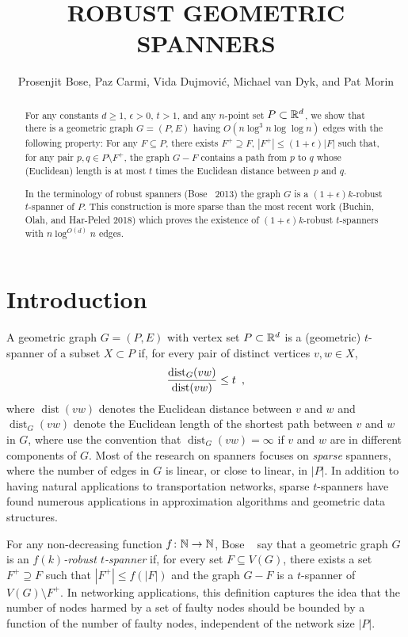 \documentclass{patmorin}
\title{\MakeUppercase{Robust Geometric Spanners}}
\author{Prosenjit Bose, Paz Carmi, Vida Dujmovi\'c, 
        Michael van Dyk, and Pat Morin}
\DeclareMathOperator{\dist}{dist}
\begin{document}
\maketitle


\begin{abstract}
  For any constants $d\ge 1$, $\epsilon >0$, $t>1$, and any $n$-point
  set $P\subset\mathbb{R}^d$, we show that there is a geometric graph $G=(P,E)$
  having $O(n\log^3 n\log\log n)$ edges with the following property:
  For any $F\subseteq P$, there exists $F^+\supseteq F$, $|F^+| \le
  (1+\epsilon)|F|$ such that, for any pair $p,q\in P\setminus F^+$,
  the graph $G-F$ contains a path from $p$ to $q$ whose (Euclidean)
  length is at most $t$ times the Euclidean distance between $p$ and $q$.
  
  In the terminology of robust spanners (Bose \etal\ 2013) the graph $G$
  is a $(1+\epsilon)k$-robust $t$-spanner of $P$. This construction is
  more sparse than the most recent work (Buchin, Olah, and Har-Peled 2018)
  which proves the existence of $(1+\epsilon)k$-robust $t$-spanners with
  $n\log^{O(d)} n$ edges.
\end{abstract}

\section{Introduction}

A geometric graph $G=(P,E)$ with vertex set $P\subset\mathbb{R}^d$ is a (geometric)
$t$-spanner of a subset $X\subset P$ if, for every pair of distinct vertices
$v,w\in X$, 
\begin{equation}
	\frac{\dist_G(vw)}{\dist(vw)} \le t \enspace , \eqlabel{spanning-ratio}
\end{equation}
where $\dist(vw)$ denotes the Euclidean distance between $v$ and $w$ and
$\dist_G(vw)$ denote the Euclidean length of the shortest path between $v$
and $w$ in $G$, where use the convention that $\dist_G(vw)=\infty$ if $v$
and $w$ are in different components of $G$.  
Most of the research on spanners focuses on \emph{sparse}
spanners, where the number of edges in $G$ is linear, or close to linear,
in $|P|$.  In addition to having natural applications to transportation
networks, sparse $t$-spanners have found numerous applications in
approximation algorithms and geometric data structures.

For any non-decreasing function $f\colon\mathbb{N}\to\mathbb{N}$, Bose \etal\
\cite{bose.dujmovic.ea:robust} say that a geometric graph $G$ is an
\emph{$f(k)$-robust $t$-spanner} if, for every set $F\subseteq V(G)$,
there exists a set $F^+\supseteq F$ such that $|F^+|\le f(|F|)$ and
the graph $G-F$ is a $t$-spanner of $V(G)\setminus F^+$.  In networking
applications, this definition captures the idea that the number of nodes
harmed by a set of faulty nodes should be bounded by a function of the
number of faulty nodes, independent of the network size $|P|$.
\end{document}
